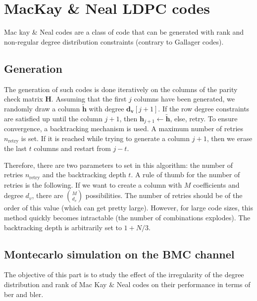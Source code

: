 \section{MacKay \& Neal LDPC codes}
Mac kay \& Neal codes are a class of code that can be generated with rank and
non-regular degree distribution constraints (contrary to Gallager codes).

\subsection{Generation}
The generation of such codes is done iteratively on the columns of the parity
check matrix $\bm{H}$. Assuming that the first $j$ columns have been generated,
we randomly draw a column $\bm{\tilde{h}}$ with degree $\bm{d_v}[j+1]$. If the
row degree constraints are satisfied up until the column $j+1$, then
$\bm{h}_{j+1} \leftarrow \bm{\tilde{h}}$, else, retry. To ensure convergence, a
backtracking mechanism is used. A maximum number of retries $n_\text{retry}$ is
set. If it is reached while trying to generate a column $j + 1$, then we erase
the last $t$ columns and restart from $j - t$.

Therefore, there are two parameters to set in this algorithm: the number of
retries $n_\text{retry}$ and the backtracking depth $t$. A rule of thumb for the
number of retries is the following. If we want to create a column with $M$
coefficients and degree $d_v$, there are $\binom{M}{d_v}$ possibilities. The
number of retries should be of the order of this value (which can get pretty
large). However, for large code sizes, this method quickly becomes intractable
(the number of combinations explodes). The backtracking depth is arbitrarily set
to $1 + N/3$.

\subsection{Montecarlo simulation on the BMC channel}

The objective of this part is to study the effect of the irregularity of the
degree distribution and rank of Mac Kay \& Neal codes on their performance in
terms of \acrshort{ber} and \acrshort{bler}.

